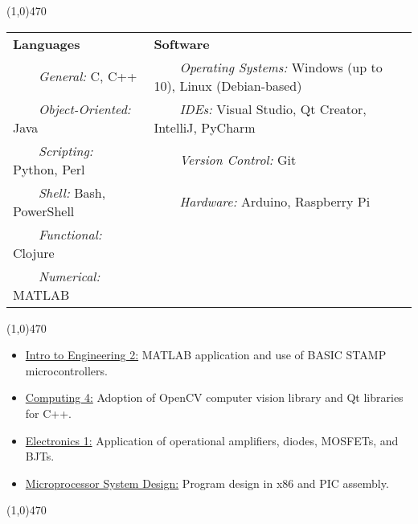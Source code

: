 \documentclass[11pt, a4paper]{article} %
\newcommand{\tabitem}{~~\llap{\textbullet}~~}
\begin{document}
\noindent \line(1,0){470}\\

 \smallskip
\vspace{-10pt}
\begin{center}
\begin{tabular}{l|l}
	{\bf Languages} & {\bf Software} \\
	\tabitem \textit{General:} C, C++ & \tabitem \textit{Operating Systems:} Windows (up to 10), Linux (Debian-based)\\
	\tabitem \textit{Object-Oriented:} Java & \tabitem \textit{IDEs:} Visual Studio, Qt Creator, IntelliJ, PyCharm\\
	\tabitem \textit{Scripting:} Python, Perl & \tabitem \textit{Version Control:} Git\\
	\tabitem \textit{Shell:} Bash, PowerShell & \tabitem \textit{Hardware:} Arduino, Raspberry Pi\\
	\tabitem \textit{Functional:} Clojure & ~\\
	\tabitem \textit{Numerical:} MATLAB & ~\\
\end{tabular}
\end{center}

\noindent \line(1,0){470}\\

\begin{itemize}
\itemsep0em
	\item \underline{Intro to Engineering 2:} MATLAB application and use of BASIC STAMP microcontrollers.	
	\item \underline{Computing 4:} Adoption of OpenCV computer vision library and Qt libraries for C++.
	\item \underline{Electronics 1:} Application of operational amplifiers, diodes, MOSFETs, and BJTs.
	\item \underline{Microprocessor System Design:} Program design in x86 and PIC assembly.
\end{itemize}

\noindent \line(1,0){470} \\
\end{document}
